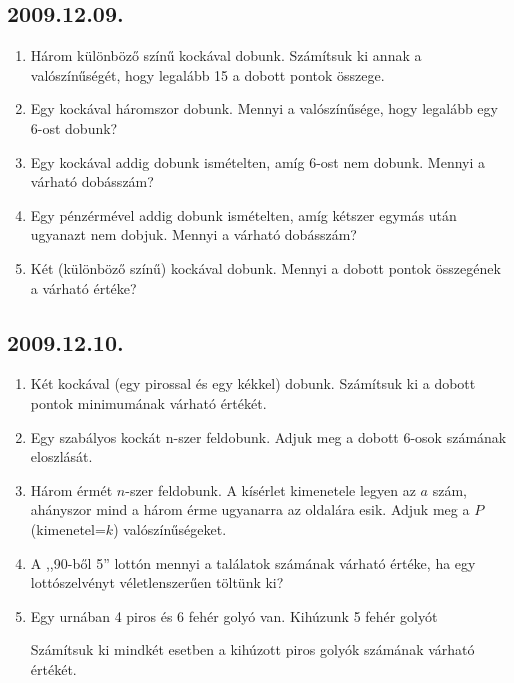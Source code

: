 \subsection*{2009.12.09.}
\begin{enumerate}
\item Három különböző színű kockával dobunk. Számítsuk ki annak a valószínűségét, hogy legalább 15 a dobott pontok összege.
\item Egy kockával háromszor dobunk. Mennyi a valószínűsége, hogy legalább egy 6-ost dobunk?
\item Egy kockával addig dobunk ismételten, amíg 6-ost nem dobunk. Mennyi a várható dobásszám?
\item Egy pénzérmével addig dobunk ismételten, amíg kétszer egymás után ugyanazt nem dobjuk. Mennyi a várható dobásszám?
\item Két (különböző színű) kockával dobunk. Mennyi a dobott pontok összegének a várható értéke?
\end{enumerate}

\subsection*{2009.12.10.}
\begin{enumerate}
\item Két kockával (egy pirossal és egy kékkel) dobunk. Számítsuk ki a dobott pontok minimumának várható értékét.
\item Egy szabályos kockát n-szer feldobunk. Adjuk meg a dobott 6-osok számának eloszlását.
\item Három érmét $n$-szer feldobunk. A kísérlet kimenetele legyen az $a$ szám, ahányszor mind a három érme ugyanarra az oldalára esik. Adjuk meg a $P$(kimenetel=$k$) valószínűségeket.
\item A ,,90-ből 5'' lottón mennyi a találatok számának várható értéke, ha egy lottószelvényt véletlenszerűen töltünk ki?
\item Egy urnában 4 piros és 6 fehér golyó van. Kihúzunk 5 fehér golyót
Számítsuk ki mindkét esetben a kihúzott piros golyók számának várható értékét.
\end{enumerate}



